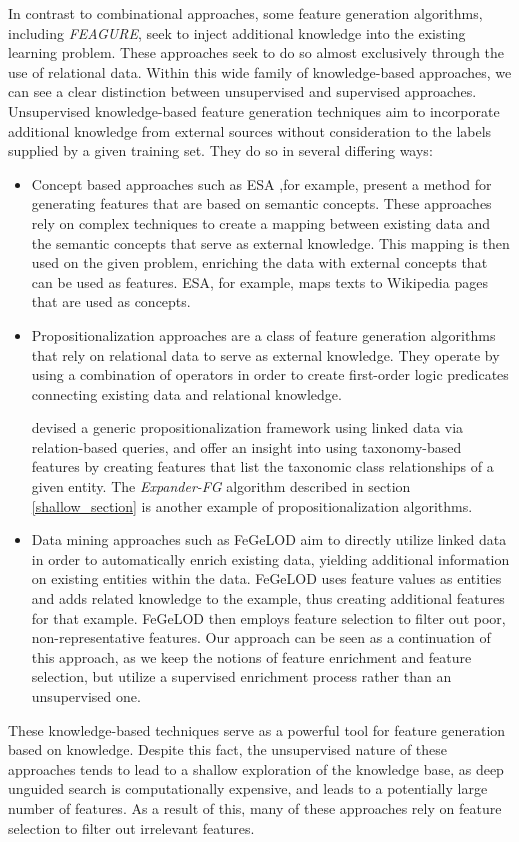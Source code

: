 \documentclass[twoside,11pt]{article}
\theoremstyle{definition}
\begin{document}
In contrast to combinational approaches, some feature generation algorithms, including \emph{FEAGURE}, seek to inject additional knowledge into the existing learning problem. These approaches seek to do so almost exclusively through the use of relational data. 
Within this wide family of knowledge-based approaches, we can see a clear distinction between unsupervised and supervised approaches.
Unsupervised knowledge-based feature generation techniques aim to incorporate additional knowledge from external sources without consideration to the labels supplied by a given training set. They do so in several differing ways:
\begin{itemize}
	\item Concept based approaches such as ESA \cite{gabrilovich2009wikipediafull} ,for example, present a method for generating features that are based on semantic concepts. These approaches rely on complex techniques to create a mapping between existing data and the semantic concepts that serve as external knowledge. This mapping is then used on the given problem, enriching the data with external concepts that can be used as features. ESA, for example, maps texts to Wikipedia pages that are used as concepts.
	\item Propositionalization \cite{kramer2000bottom} approaches are a class of feature generation algorithms that rely on relational data to serve as external knowledge. They operate by using a combination of operators in order to create first-order logic predicates connecting existing data and relational knowledge. 
	
	 devised a generic propositionalization framework  using linked data via relation-based queries, and offer an insight into using taxonomy-based features by creating features that list the taxonomic class relationships of a given entity.
	The \emph{Expander-FG} algorithm described in section \ref{shallow_section} is another example of propositionalization algorithms.
	\item Data mining approaches such as FeGeLOD \cite{paulheim2012unsupervisedfull} aim to directly utilize linked data in order to automatically enrich existing data, yielding additional information on existing entities within the data. FeGeLOD uses feature values as entities and adds related knowledge to the example, thus creating additional features for that example. FeGeLOD then employs feature selection to filter out poor, non-representative features. Our approach can be seen as a continuation of this approach, as we keep the notions of feature enrichment and feature selection, but utilize a supervised enrichment process rather than an unsupervised one.
\end{itemize}
These knowledge-based techniques serve as a powerful tool for feature generation based on knowledge. Despite this fact, the unsupervised nature of these approaches tends to lead to a shallow exploration of the knowledge base, as deep unguided search is computationally expensive, and leads to a potentially large number of features. As a result of this, many of these approaches rely on feature selection to filter out irrelevant features.
\end{document}
